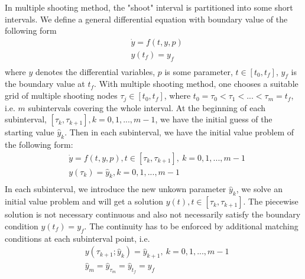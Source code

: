 \documentclass  [
  paper    = a4,
  BCOR     = 10mm,
  twoside,
  fontsize = 12pt,
  fleqn,
  toc      = bibnumbered,
  toc      = listofnumbered,
  numbers  = noendperiod,
  headings = normal,
  listof   = leveldown,
  version  = 3.03
]                                       {scrreprt}
\newcommand{\<}{\langle}
\renewcommand{\>}{\rangle}
\begin{document}
   In multiple shooting method, the "shoot" interval is partitioned into some short intervals. We define a general differential equation with boundary value of the following form
   \begin{equation}\label{eqn:ori_dae}
   \begin{aligned}
   & \dot{y} = f(t, y, p) \\ 
   & y(t_f) = y_f  \\
   \end{aligned}
   \end{equation}
   where $y$ denotes the differential variables, $p$ is some parameter, $t \in [t_0, t_f]$,  $y_f$ is the boundary value at $t_f$.  With multiple shooting method, one chooses a suitable grid of multiple shooting nodes $\tau_j \in [t_0,t_f] $, where $t_0 = \tau_0 < \tau_1 < ... < \tau_m = t_f$,  i.e. $m$ subintervals covering the whole interval. At the beginning of each subinterval, $[\tau_k, \tau_{k+1}], k = 0, 1, ..., m-1$, we have the initial guess of the starting value $\hat{y}_k$. Then in each subinterval, we have the initial value problem of the following form: 
   \begin{equation}\label{eqn:msh}
   \begin{aligned}
   & \dot{y} = f(t, y, p) , t \in [\tau_k, \tau_{k+1}], \ k = 0, 1, ..., m-1   \\ 
   & y(\tau_k) = \hat{y}_k, k = 0, 1, ..., m-1  \\
   \end{aligned}
   \end{equation}
   In each subinterval, we introduce the new unkown parameter $\hat{y}_k$, we solve an initial value problem and will get a solution $y(t), t \in [\tau_k, \tau_{k+1}]$. The piecewise solution is not necessary continuous and also not necessarily satisfy the boundary condition $y(t_f) = y_f$. The continuity has to be enforced by additional matching conditions at each subinterval point, i.e. 
   \begin{equation}\label{eqn:mc}
   \begin{aligned}
   & y(\tau_{k+1}; \hat{y}_k) = \hat{y}_{k+1}, \  k = 0, 1, ..., m-1  \\
   & \hat{y}_{m} = \hat{y}_{\tau_m} = \hat{y}_{t_f} =  y_f 
   \end{aligned}
   \end{equation}
   
\end{document}
